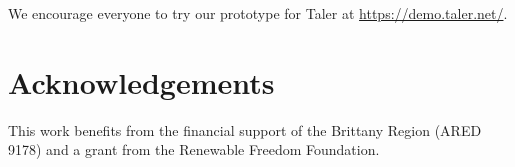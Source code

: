 \documentclass[twoside,letterpaper]{sigalternate}
\begin{document}
We encourage everyone to try our prototype for Taler
at \url{https://demo.taler.net/}.




\section*{Acknowledgements}

This work benefits from the financial support of the Brittany Region
(ARED 9178) and a grant from the Renewable Freedom Foundation.




\end{document}
